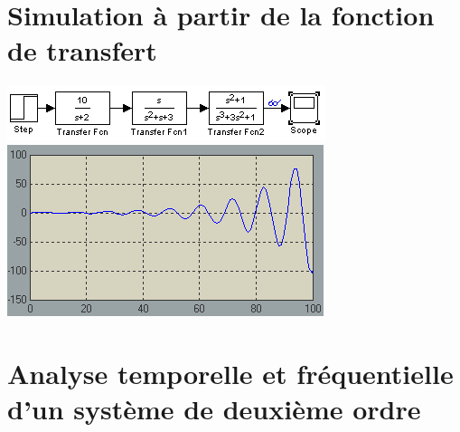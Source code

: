 \documentclass[10pt]{article}
\begin{document}
 \section{Simulation à partir de la fonction de transfert}
  \begin{center}
   \includegraphics{2_sb}
   \includegraphics{2_simu}
  \end{center}
 \section{Analyse temporelle et fréquentielle d’un système de deuxième ordre}
\end{document}
